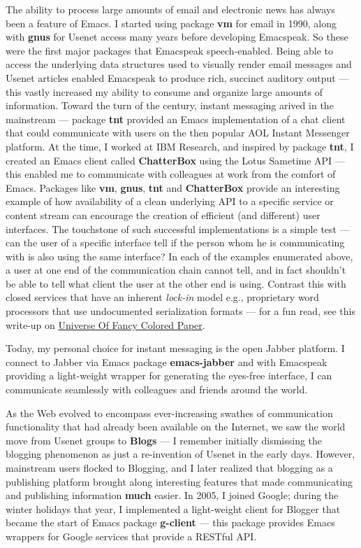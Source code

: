 \documentclass[11pt]{article}
\begin{document}
The ability to process large amounts of email and electronic news
has always been a feature of Emacs. I started using package \textbf{vm}
for email in 1990, along with \textbf{gnus} for Usenet access many years
before developing Emacspeak. So these were the first major
packages that Emacspeak speech-enabled. Being able to access the
underlying data structures used to visually render email messages
and Usenet articles enabled Emacspeak to produce rich, succinct
auditory output — this vastly increased my ability to consume and
organize large amounts of information. Toward the turn of the
century, instant messaging arived in the mainstream — package
\textbf{tnt} provided an Emacs implementation of a chat client that
could communicate with users on the then popular AOL Instant
Messenger platform. At the time, I worked at IBM Research, and
inspired by package \textbf{tnt}, I created an Emacs client called
\textbf{ChatterBox} using the Lotus Sametime API — this enabled me to
communicate with colleagues at work from the comfort of
Emacs. Packages like \textbf{vm}, \textbf{gnus}, \textbf{tnt} and \textbf{ChatterBox} provide
an interesting example of how availability of a clean underlying
API to a specific service or content stream can encourage the
creation of efficient (and different) user interfaces. The
touchstone of such successful implementations is a simple test —
can the user of a specific interface tell if the person whom he
is communicating with is also using the same interface? In each
of the examples enumerated above, a user at one end of the
communication chain cannot tell, and in fact shouldn't be able to
tell what client the user at the other end is using. Contrast
this with closed services that have an inherent \emph{lock-in} model
e.g., proprietary word processors that use undocumented
serialization formats — for a fun read, see this write-up on
\href{http://emacspeak.sourceforge.net/publications/colored-paper.html}{Universe Of Fancy Colored Paper}.


Today, my personal choice for instant messaging is the open
Jabber platform. I connect to Jabber via Emacs package
\textbf{emacs-jabber} and with Emacspeak providing a light-weight
wrapper for generating the eyes-free interface, I can communicate
seamlessly with colleagues and friends around the world.

As the Web evolved to encompass ever-increasing swathes of
communication functionality that had already been available on
the Internet, we saw the world move from Usenet groups to \textbf{Blogs}
— I remember initially dismissing the blogging phenomenon as just
a re-invention of Usenet in the early days. However, mainstream
users flocked to Blogging, and I later realized that blogging as
a publishing platform brought along interesting features that
made communicating and publishing information \textbf{much} easier. In
2005, I joined Google; during the winter holidays that year, I
implemented a light-weight client for Blogger that became the
start of Emacs package \textbf{g-client} — this package provides Emacs
wrappers for Google services that provide a RESTful API.
\end{document}
